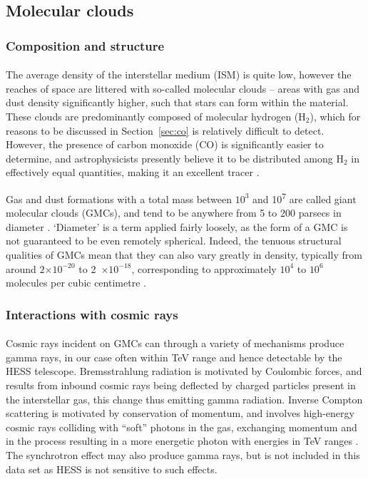 \documentclass[a4paper, titlepage, oneside]{article}
\newcommand{\molec}[2]{\ensuremath{\text{#1}_{#2}}}
\newcommand{\e}[1]{\ensuremath{\times 10^{#1}}}
\newcommand{\smass}{\mathrm{M_\odot}}
\begin{document}
\begin{multicols}{2}
\subsection{Molecular clouds}
\subsubsection{Composition and structure}
\paragraph{}
The average density of the interstellar medium (ISM) is quite low, however the reaches of space are littered with so-called molecular clouds -- areas with gas and dust density significantly higher, such that stars can form within the material. These clouds are predominantly composed of molecular hydrogen (\molec{H}{2}), which for reasons to be discussed in Section~\ref{sec:co} is relatively difficult to detect. However, the presence of carbon monoxide (CO) is significantly easier to determine, and astrophysicists presently believe it to be distributed among \molec{H}{2} in effectively equal quantities, making it an excellent tracer \parencite{Glover:2011}.

Gas and dust formations with a total mass between \(10^3\) and \unit{10^7}{\smass} are called giant molecular clouds (GMCs), and tend to be anywhere from 5 to 200 parsecs in diameter \parencite{Murray:2011}. `Diameter' is a term applied fairly loosely, as the form of a GMC is not guaranteed to be even remotely spherical. Indeed, the tenuous structural qualities of GMCs mean that they can also vary greatly in density, typically from around \(2\e{-20}\) to \unit{2\e{-18}}{\gram\usk\centi\metre\rpcubed}, corresponding to approximately \(10^4\) to \(10^6\) molecules per cubic centimetre \parencite{Ferriere:2001}.

\subsubsection{Interactions with cosmic rays}
\paragraph{}
Cosmic rays incident on GMCs can through a variety of mechanisms produce gamma rays, in our case often within TeV range and hence detectable by the HESS telescope. Bremsstrahlung radiation is motivated by Coulombic forces, and results from inbound cosmic rays being deflected by charged particles present in the interstellar gas, this change thus emitting gamma radiation. Inverse Compton scattering is motivated by conservation of momentum, and involves high-energy cosmic rays colliding with ``soft'' photons in the gas, exchanging momentum and in the process resulting in a more energetic photon with energies in TeV ranges \parencite{Ferriere:2001}. The synchrotron effect may also produce gamma rays, but is not included in this data set as HESS is not sensitive to such effects.


\end{multicols}
\end{document}
